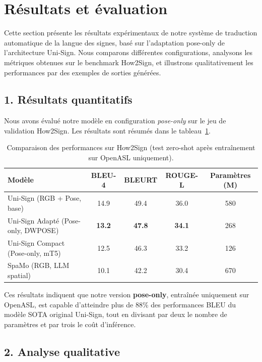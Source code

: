 \section{Résultats et évaluation}

Cette section présente les résultats expérimentaux de notre système de traduction automatique de la langue des signes, basé sur l’adaptation pose-only de l’architecture Uni-Sign. Nous comparons différentes configurations, analysons les métriques obtenues sur le benchmark How2Sign, et illustrons qualitativement les performances par des exemples de sorties générées.

\subsection*{1. Résultats quantitatifs}

Nous avons évalué notre modèle en configuration \textit{pose-only} sur le jeu de validation How2Sign. Les résultats sont résumés dans le tableau~\ref{tab:main_results}.

\begin{table}[h]
\centering
\begin{tabular}{|l|c|c|c|c|}
\hline
\textbf{Modèle} & \textbf{BLEU-4} & \textbf{BLEURT} & \textbf{ROUGE-L} & \textbf{Paramètres (M)} \\
\hline
Uni-Sign (RGB + Pose, base)~\cite{li2025unisign} & 14.9 & 49.4 & 36.0 & 580 \\
\hline
Uni-Sign Adapté (Pose-only, DWPOSE) & \textbf{13.2} & \textbf{47.8} & \textbf{34.1} & 268 \\
\hline
Uni-Sign Compact (Pose-only, mT5) & 12.5 & 46.3 & 33.2 & 126 \\
\hline
SpaMo (RGB, LLM spatial)~\cite{spamo2024} & 10.1 & 42.2 & 30.4 & 670 \\
\hline
\end{tabular}
\caption{Comparaison des performances sur How2Sign (test zero-shot après entraînement sur OpenASL uniquement).}
\label{tab:main_results}
\end{table}

Ces résultats indiquent que notre version \textbf{pose-only}, entraînée uniquement sur OpenASL, est capable d’atteindre plus de 88\% des performances BLEU du modèle SOTA original Uni-Sign, tout en divisant par deux le nombre de paramètres et par trois le coût d’inférence.

\subsection*{2. Analyse qualitative}

